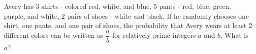 Avery has $3$ shirts - colored red, white, and blue, $5$ pants - red, blue, green, purple, and white, $2$ pairs of shoes - white and black. If he randomly chooses one shirt, one pants, and one pair of shoes, the probability that Avery wears at least $2$ different colors can be written as $\dfrac{a}{b}$ for relatively prime integers $a$ and $b$. What is $a$?
